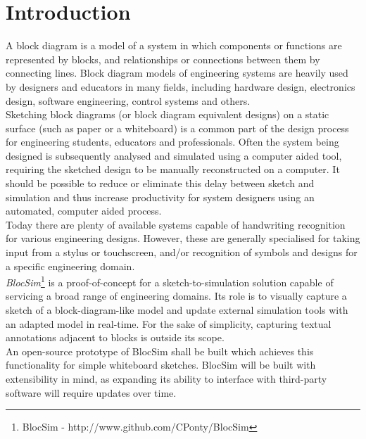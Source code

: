 \mainmatter


\chapter{Introduction}

A block diagram is a model of a system in which components or functions are represented by blocks, and relationships or connections between them by connecting lines. Block diagram models of engineering systems are heavily used by designers and educators in many fields, including hardware design, electronics design, software engineering, control systems and others.
\\

Sketching block diagrams (or block diagram equivalent designs) on a static surface (such as paper or a whiteboard) is a common part of the design process for engineering students, educators and professionals. Often the system being designed is subsequently analysed and simulated using a computer aided tool, requiring the sketched design to be manually reconstructed on a computer. It should be possible to reduce or eliminate this delay between sketch and simulation and thus increase productivity for system designers using an automated, computer aided process.
\\

Today there are plenty of available systems capable of handwriting recognition for various engineering designs. However, these are generally specialised for taking input from a stylus or touchscreen, and/or recognition of symbols and designs for a specific engineering domain.
\\

\textit{BlocSim}\footnote{BlocSim - http://www.github.com/CPonty/BlocSim} is a proof-of-concept for a sketch-to-simulation solution capable of servicing a broad range of engineering domains. Its role is to visually capture a sketch of a block-diagram-like model and update external simulation tools with an adapted model in real-time. For the sake of simplicity, capturing textual annotations adjacent to blocks is outside its scope.
\\

An open-source prototype of BlocSim shall be built which achieves this functionality for simple whiteboard sketches. BlocSim will be built with extensibility in mind, as expanding its ability to interface with third-party software will require updates over time.



